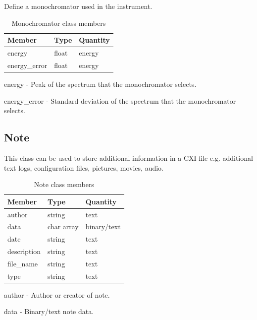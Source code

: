 \documentclass[usletter,11pt]{article}
\newcommand{\member}[2]
{ \noindent
{ \color{softBlue}  #1 - } #2
\vspace{0.2cm}
}
\begin{document}
Define a monochromator used in the instrument.

\begin{table}[h!]\sffamily \footnotesize
\caption{Monochromator class members}

\begin{tabular}{p{4.5cm} p{4.5cm}  p{2.5cm} }
\toprule
\bfseries Member     & \bfseries Type & \bfseries Quantity \\
\midrule

energy & float & energy \\
energy\_error & float & energy \\
\bottomrule
\end{tabular}
\end{table}

\member{energy}{Peak of the spectrum that the  monochromator selects.}

\member{energy\_error}{Standard deviation of the spectrum that the  monochromator selects.}

\subsection{Note}
\label{table:note}

This class can be used to store additional information in a CXI file
e.g. additional text logs, configuration files, pictures, movies, audio.

\begin{table}[h!]\sffamily \footnotesize
\caption{Note class members}

\begin{tabular}{p{4.5cm} p{4.5cm}  p{2.5cm} }
\toprule
\bfseries Member     & \bfseries Type & \bfseries Quantity \\
\midrule

author & string & text \\
data & char array & binary/text \\
date & string & text \\
description & string & text \\
file\_name & string & text \\
type & string & text \\
\bottomrule
\end{tabular}
\end{table}

\member{author}{Author or creator of note.}

\member{data}{Binary/text note data.}
\end{document}
